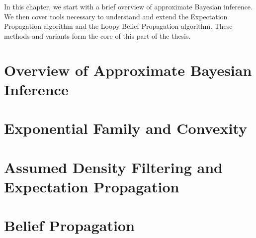 
In this chapter, we start with a brief overview of approximate Bayesian inference. We then cover tools  necessary to understand and extend the Expectation Propagation algorithm and the Loopy Belief Propagation algorithm. These methods and variants form the core of this part of the thesis.

\section{Overview of Approximate Bayesian Inference}



\section{\label{point:expof-convex}Exponential Family and Convexity}





\section{\label{s:ADF+EP}Assumed Density Filtering and Expectation Propagation}


\section{\label{bg:belief-propag}Belief Propagation}







